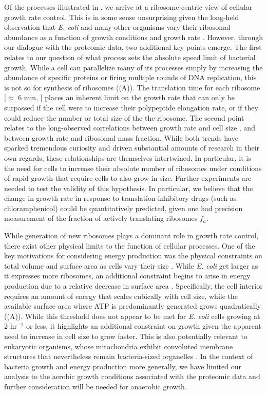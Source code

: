 Of the processes illustrated in , we arrive at a
ribosome-centric view of cellular growth rate control. This is in some sense
unsurprising given the long-held observation that \textit{E. coli} and many
other organisms vary their ribosomal abundance as a function of growth
conditions and growth rate \cite{scott2010, metzlraz2017}. However, through
our dialogue with the proteomic data, two additional key points emerge. The
first relates to our question of what process sets the absolute speed limit
of bacterial growth. While a cell can parallelize many of its processes
simply by increasing the abundance of specific proteins or firing multiple
rounds of DNA replication, this is not so for synthesis of ribosomes
((A)). The translation time for each ribosome [$\approx$
6 min, \cite{dill2011}] places an inherent limit on the growth rate that can
only be surpassed if the cell were to increase their polypeptide elongation
rate, or if they could reduce the number or total size of the the ribosome.
The second point relates to the long-observed correlations between growth
rate and cell size \citep{schaechter1958, si2017}, and between growth rate
and ribosomal mass fraction. While both trends have sparked tremendous
curiosity and driven substantial amounts of research in their own regards,
these relationships are themselves intertwined. In particular, it is the need
for cells to increase their absolute number of ribosomes under conditions of
rapid growth that require cells to also grow in size. Further experiments are
needed to test the validity of this hypothesis. In particular, we believe
that the change in growth rate in response to translation-inhibitory drugs
(such as chloramphenicol) could be quantitatively predicted, given one had
precision measurement of the fraction of actively translating ribosomes
$f_a$.

While generation of new ribosomes plays a dominant role in growth rate
control, there exist other physical limits to the function of cellular
processes. One of the key motivations for considering energy production was
the physical constraints on total volume and surface area as cells vary
their size \citep{harris2016, ojkic2019}. While \textit{E. coli} get larger
as it expresses more ribosomes, an additional constraint begins to arise in
energy production due to a relative decrease in surface area
\citep{szenk2017}. Specifically, the cell interior requires an amount of
energy that scales cubically with cell size, while the available surface area
where ATP is predominantly generated grows quadratically
((A)). While this threshold does not appear to be met for
\textit{E. coli} cells growing at 2 hr$^{-1}$ or less, it highlights an
additional constraint on growth given the apparent need to increase in cell
size to grow faster. This is also potentially relevant to eukaryotic
organisms, whose mitochondria exhibit convoluted membrane structures that
nevertheless remain bacteria-sized organelles \citep{guo2018}. In the context
of bacteria growth and energy production more generally, we have limited our
analysis to the aerobic growth conditions associated with the proteomic data
and further consideration will be needed for anaerobic growth.

